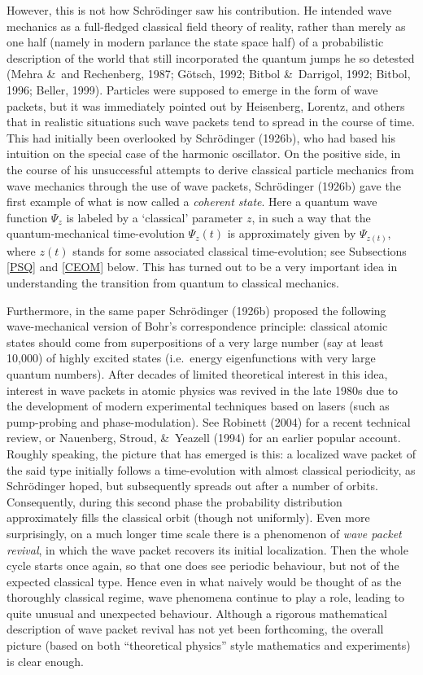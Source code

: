 \documentclass[12pt,titlepage]{article}
\begin{document}
However, this is not how Schr\"{o}dinger saw his contribution. He intended wave mechanics as a full-fledged classical field theory of reality, rather than merely as one half (namely in modern parlance the state space half) of a probabilistic description of the world that still incorporated the quantum jumps he so detested (Mehra \&\ and Rechenberg,  1987; G\"{o}tsch, 1992; Bitbol \&\ Darrigol, 1992; Bitbol, 1996;  Beller, 1999). 
Particles were supposed to emerge in the form of wave packets, but it was immediately pointed out by Heisenberg, Lorentz,  and others that in realistic situations such wave packets tend to spread in the course of time. This had initially been overlooked by Schr\"{o}dinger (1926b), who had based his intuition on the special case of the harmonic oscillator. On the positive side, in the course of his unsuccessful attempts to derive classical particle mechanics from wave mechanics through the use of wave packets, Schr\"{o}dinger (1926b) gave the first example of what is now called a {\it coherent state}.
Here a quantum wave function $\Psi_z$ is labeled by a `classical' parameter $z$, in such a way that the quantum-mechanical time-evolution $\Psi_z(t)$ is approximately given by
$\Psi_{z(t)}$, where $z(t)$ stands for some associated classical time-evolution; see Subsections \ref{PSQ} and \ref{CEOM} below. This has turned out to be a very important idea in understanding the transition from quantum to classical mechanics. 

Furthermore, in the same paper Schr\"{o}dinger (1926b) proposed the following wave-mechanical version  of Bohr's correspondence principle: classical atomic states should come from superpositions of a very large number (say at least 10,000) of highly excited states (i.e.\ 
energy eigenfunctions with very large quantum numbers). After decades of limited theoretical interest in this idea, interest in wave packets in atomic physics was revived in the late 1980s  due to the development of modern experimental techniques based on lasers (such as pump-probing and phase-modulation). See  Robinett (2004) for a recent technical review, or  Nauenberg,  Stroud, \&\ Yeazell (1994) for an earlier popular account. Roughly speaking, the picture that has emerged is this: a localized wave packet of the said type initially follows a time-evolution with almost classical periodicity, as Schr\"{o}dinger hoped, but subsequently spreads out after a number of orbits. Consequently, during this second phase the probability distribution  approximately fills the classical orbit (though not uniformly). Even more surprisingly, on a much longer time scale there is a phenomenon of {\it wave packet revival}, in which the wave packet recovers its initial localization. Then the whole cycle starts once again, so that one does see periodic behaviour, but not of the expected classical type. Hence even in what naively would be thought of as the thoroughly  classical regime, wave phenomena continue to play a role,  leading to quite unusual and unexpected behaviour. Although a rigorous mathematical description of wave packet revival has not yet been forthcoming, the overall picture (based on both ``theoretical physics'' style mathematics and experiments) is clear enough.
\end{document}
